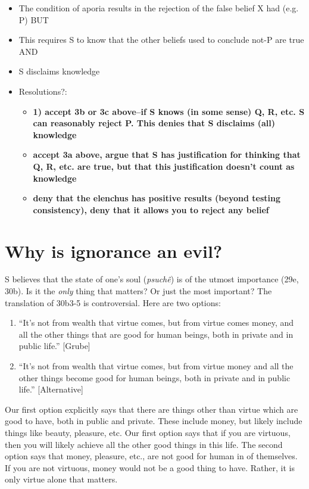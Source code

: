 \documentclass[10 pt]{article}
\begin{document}
\begin{itemize}
\item{The condition of aporia results in the rejection of the false belief X had (e.g. P) BUT}
\item{This requires S to know that the other beliefs used to conclude not-P are true AND}
\item{S disclaims knowledge}
\item{Resolutions?:}
\begin{itemize}
\item{\textbf{1) accept 3b or 3c above--if S knows (in some sense) Q, R, etc. S can reasonably reject P. This denies that S disclaims (all) knowledge}}
\item{\textbf{accept 3a above, argue that S has justification for thinking that Q, R, etc. are true, but that this justification doesn't count as knowledge}}
\item{\textbf{deny that the elenchus has positive results (beyond testing consistency), deny that it allows you to reject any belief}}
\end{itemize}
\end{itemize}

\section*{Why is ignorance an evil?}

S believes that the state of one's soul (\emph{psuch\^{e}}) is of the utmost importance (29e, 30b). Is it the \emph{only} thing that matters? Or just the most important? The translation of 30b3-5 is controversial. Here are two options:
\begin{enumerate}
\item ``It's not from wealth that virtue comes, but from virtue comes money, and all the other things that are good for human beings, both in private and in public life.'' [Grube]
\item  ``It's not from wealth that virtue comes, but from virtue money and all the other things become good for human beings, both in private and in public life.'' [Alternative]
\end{enumerate}
Our first option explicitly says that there are things other than virtue which are good to have, both in public and private. These include money, but likely include things like beauty, pleasure, etc. Our first option says that if you are virtuous, then you will likely achieve all the other good things in this life. The second option says that money, pleasure, etc., are not good for human in of themselves. If you are not virtuous, money would not be a good thing to have. Rather, it is only virtue alone that matters. 
\end{document}
